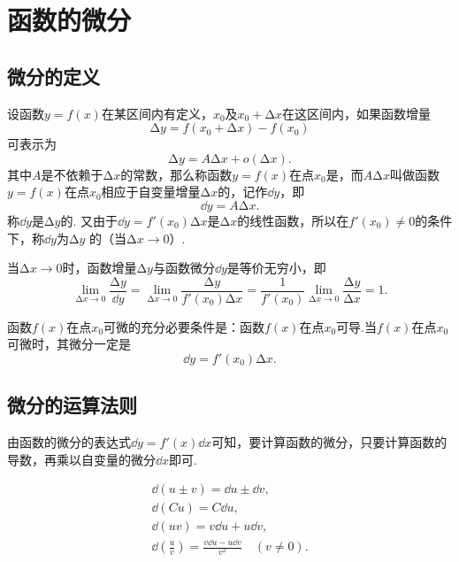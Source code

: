 \section{函数的微分}
\subsection{微分的定义}
\begin{definition}
设函数\(y=f(x)\)在某区间内有定义，\(x_0\)及\(x_0+\increment x\)在这区间内，如果函数增量\[
\increment y=f(x_0+\increment x)-f(x_0)
\]可表示为\[
\increment y=A\increment x+o(\increment x).
\]其中\(A\)是不依赖于\(\increment x\)的常数，那么称函数\(y=f(x)\)在点\(x_0\)是，而\(A\increment x\)叫做函数\(y=f(x)\)在点\(x_0\)相应于自变量增量\(\increment x\)的，记作\(\dd{y}\)，即\[
\dd{y}=A\increment x.
\]称\(\dd{y}\)是\(\increment y\)的.
又由于\(\dd{y}=f'(x_0)\increment x\)是\(\increment x\)的线性函数，所以在\(f'(x_0) \neq 0\)的条件下，称\(\dd{y}\)为\(\increment y\) 的（当\(\increment x\to0\)）.
\end{definition}

\begin{property}
当\(\increment x\to0\)时，函数增量\(\increment y\)与函数微分\(\dd{y}\)是等价无穷小，即\[
\lim_{\increment x\to0} \frac{\increment y}{\dd{y}}
= \lim_{\increment x\to0} \frac{\increment y}{f'(x_0) \increment x}
= \frac{1}{f'(x_0)} \lim_{\increment x\to0} \frac{\increment y}{\increment x}
= 1.
\]
\end{property}

\begin{theorem}
函数\(f(x)\)在点\(x_0\)可微的充分必要条件是：函数\(f(x)\)在点\(x_0\)可导.当\(f(x)\)在点\(x_0\)可微时，其微分一定是\[
\dd{y}=f'(x_0)\increment x.
\]
\end{theorem}

\subsection{微分的运算法则}
由函数的微分的表达式\(\dd{y} = f'(x) \dd{x}\)可知，要计算函数的微分，只要计算函数的导数，再乘以自变量的微分\(\dd{x}\)即可.

\begin{theorem}
\begin{gather}
	\dd(u \pm v) = \dd{u}\pm\dd{v}, \\
	\dd(C u) = C \dd{u}, \\
	\dd(u v) = v \dd{u} + u \dd{v}, \\
	\dd(\frac{u}{v}) = \frac{v \dd{u} - u \dd{v}}{v^2} \quad (v \neq 0).
\end{gather}
\end{theorem}


